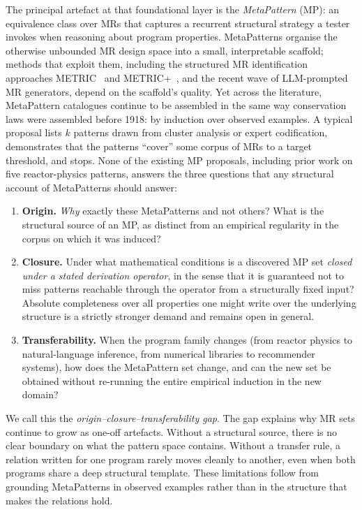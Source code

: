 \documentclass[acmsmall,screen,anonymous,review]{acmart}
\begin{document}
The principal artefact at that foundational layer is the \emph{MetaPattern} (MP): an equivalence class over MRs that captures a recurrent structural strategy a tester invokes when reasoning about program properties. MetaPatterns organise the otherwise unbounded MR design space into a small, interpretable scaffold; methods that exploit them, including the structured MR identification approaches METRIC~\cite{ChenMETRIC2016} and METRIC+~\cite{SunMETRICplus2021}, and the recent wave of LLM-prompted MR generators, depend on the scaffold's quality. Yet across the literature, MetaPattern catalogues continue to be assembled in the same way conservation laws were assembled before 1918: by induction over observed examples. A typical proposal lists $k$ patterns drawn from cluster analysis or expert codification, demonstrates that the patterns ``cover'' some corpus of MRs to a target threshold, and stops. None of the existing MP proposals, including prior work on five reactor-physics patterns, answers the three questions that any structural account of MetaPatterns should answer:

\begin{enumerate}
  \item \textbf{Origin.} \emph{Why} exactly these MetaPatterns and not others? What is the structural source of an MP, as distinct from an empirical regularity in the corpus on which it was induced?
  \item \textbf{Closure.} Under what mathematical conditions is a discovered MP set \emph{closed under a stated derivation operator}, in the sense that it is guaranteed not to miss patterns reachable through the operator from a structurally fixed input? Absolute completeness over all properties one might write over the underlying structure is a strictly stronger demand and remains open in general.
  \item \textbf{Transferability.} When the program family changes (from reactor physics to natural-language inference, from numerical libraries to recommender systems), how does the MetaPattern set change, and can the new set be obtained without re-running the entire empirical induction in the new domain?
\end{enumerate}

We call this the \emph{origin--closure--transferability gap}. The gap explains why MR sets continue to grow as one-off artefacts. Without a structural source, there is no clear boundary on what the pattern space contains. Without a transfer rule, a relation written for one program rarely moves cleanly to another, even when both programs share a deep structural template. These limitations follow from grounding MetaPatterns in observed examples rather than in the structure that makes the relations hold.
\end{document}
